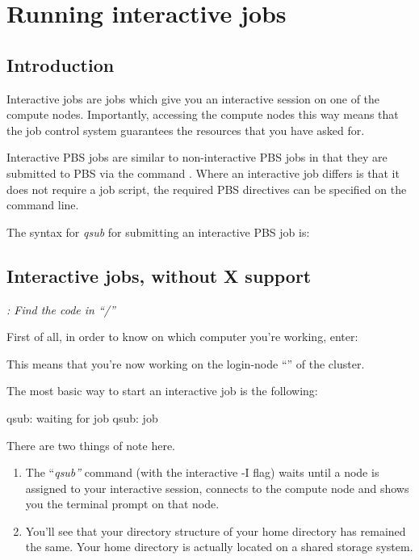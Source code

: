 \chapter{Running interactive jobs}

\section{Introduction}

Interactive jobs are jobs which give you an interactive session on one of the
compute nodes. Importantly, accessing the compute nodes this way means that the
job control system guarantees the resources that you have asked for.

Interactive PBS jobs are similar to non-interactive PBS jobs in that they are
submitted to PBS via the command . Where an interactive job
differs is that it does not require a job script, the required PBS directives
can be specified on the command line.

The syntax for \emph{qsub} for submitting an interactive PBS job is:
\begin{prompt}
\end{prompt}

\section{Interactive jobs, without X support}

\emph{: Find the code in
``\tilde/\exampledir''}

First of all, in order to know on which computer you're working, enter:
\begin{prompt}
\end{prompt}

This means that you're now working on the login-node ``\emph{\loginnode}'' of
the \hpc cluster.

The most basic way to start an interactive job is the following:
\begin{prompt}
qsub: waiting for job %
qsub: job %
\end{prompt}

There are two things of note here.

\begin{enumerate}
  \item  The ``\emph{qsub''} command (with the interactive -I
      flag) waits until a node is assigned to your interactive session,
      connects to the compute node and shows you the terminal prompt on that
      node.
  \item  You'll see that your directory structure of your home directory has
      remained the same. Your home directory is actually located on a shared
      storage system.
\end{enumerate}

